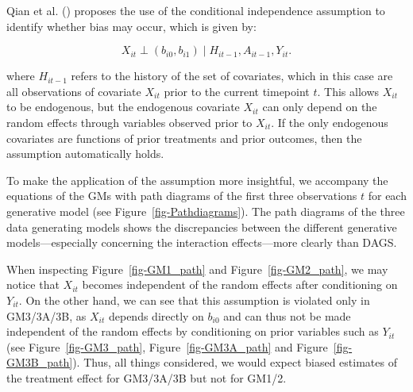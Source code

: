 \documentclass[
  12pt,
  a4paper,
]{article}
\begin{document}
Qian et al. () proposes the use of the
conditional independence assumption to identify whether bias may occur,
which is given by:

\[ X_{it} \perp (b_{i0}, b_{i1}) \mid H_{it-1}, A_{it-1}, Y_{it}. \]

where \(H_{it-1}\) refers to the history of the set of covariates, which
in this case are all observations of covariate \(X_{it}\) prior to the
current timepoint \(t\). This allows \(X_{it}\) to be endogenous, but
the endogenous covariate \(X_{it}\) can only depend on the random
effects through variables observed prior to \(X_{it}\). If the only
endogenous covariates are functions of prior treatments and prior
outcomes, then the assumption automatically holds.

To make the application of the assumption more insightful, we accompany
the equations of the GMs with path diagrams of the first three
observations \(t\) for each generative model (see
Figure~\ref{fig-Pathdiagrams}). The path diagrams of the three data
generating models shows the discrepancies between the different
generative models---especially concerning the interaction effects---more
clearly than DAGS.

When inspecting Figure~\ref{fig-GM1_path} and Figure~\ref{fig-GM2_path},
we may notice that \(X_{it}\) becomes independent of the random effects
after conditioning on \(Y_{it}\). On the other hand, we can see that
this assumption is violated only in GM3/3A/3B, as \(X_{it}\) depends
directly on \(b_{i0}\) and can thus not be made independent of the
random effects by conditioning on prior variables such as \(Y_{it}\)
(see Figure~\ref{fig-GM3_path}, Figure~\ref{fig-GM3A_path} and
Figure~\ref{fig-GM3B_path}). Thus, all things considered, we would
expect biased estimates of the treatment effect for GM3/3A/3B but not
for GM1/2.
\end{document}
